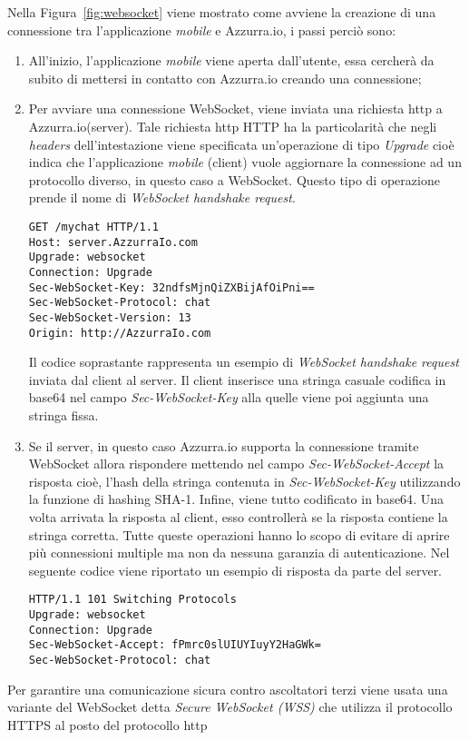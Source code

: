 Nella Figura~\ref{fig:websocket} viene mostrato come avviene la creazione di una connessione tra l'applicazione \emph{mobile} e Azzurra.io, i passi perciò sono:
\begin{enumerate}
	\item All'inizio, l'applicazione \emph{mobile} viene aperta dall'utente, essa cercherà da subito di mettersi in contatto con Azzurra.io creando una connessione;
	\item Per avviare una connessione \gls{WebSocket}\ap{[g]}, viene inviata una richiesta \gls{http}\ap{[g]} a Azzurra.io(\gls{server}\ap{[g]}). Tale richiesta \gls{http}\ap{[g]} HTTP ha la particolarità che negli \emph{headers} dell’intestazione viene specificata un'operazione di tipo \emph{Upgrade} cioè indica che l'applicazione \emph{mobile} (\gls{client}\ap{[g]}) vuole aggiornare la connessione ad un protocollo diverso, in questo caso a \gls{WebSocket}\ap{[g]}. Questo tipo di operazione prende il nome di \emph{WebSocket handshake request}.\\
	\begin{lstlisting}
GET /mychat HTTP/1.1
Host: server.AzzurraIo.com
Upgrade: websocket	
Connection: Upgrade		
Sec-WebSocket-Key: 32ndfsMjnQiZXBijAfOiPni==
Sec-WebSocket-Protocol: chat		
Sec-WebSocket-Version: 13		
Origin: http://AzzurraIo.com
	\end{lstlisting}
	Il codice soprastante rappresenta un esempio di \emph{WebSocket handshake request} inviata dal \gls{client}\ap{[g]} al \gls{server}\ap{[g]}. Il \gls{client}\ap{[g]} inserisce una stringa casuale codifica in \gls{base64}\ap{[g]} nel campo \emph{Sec-WebSocket-Key} alla quelle viene poi aggiunta una stringa fissa.
	\item Se il \gls{server}\ap{[g]}, in questo caso Azzurra.io supporta la connessione tramite \gls{WebSocket}\ap{[g]} allora rispondere mettendo nel campo \emph{Sec-WebSocket-Accept} la risposta cioè, l'hash della stringa contenuta in \emph{Sec-WebSocket-Key} utilizzando la funzione di hashing SHA-1. Infine, viene tutto codificato in \gls{base64}\ap{[g]}. Una volta arrivata la risposta al \gls{client}\ap{[g]}, esso controllerà se la risposta contiene la stringa corretta. Tutte queste operazioni hanno lo scopo di evitare di aprire più connessioni multiple ma non da nessuna garanzia di autenticazione.
	Nel seguente codice viene riportato un esempio di risposta da parte del server.\\
	\begin{lstlisting}
HTTP/1.1 101 Switching Protocols
Upgrade: websocket
Connection: Upgrade
Sec-WebSocket-Accept: fPmrc0slUIUYIuyY2HaGWk=
Sec-WebSocket-Protocol: chat
	\end{lstlisting}
\end{enumerate}
Per garantire una comunicazione sicura contro ascoltatori terzi viene usata una variante del \gls{WebSocket}\ap{[g]} detta \emph{Secure WebSocket (WSS)} che utilizza il protocollo HTTPS al posto del protocollo \gls{http}\ap{[g]}
